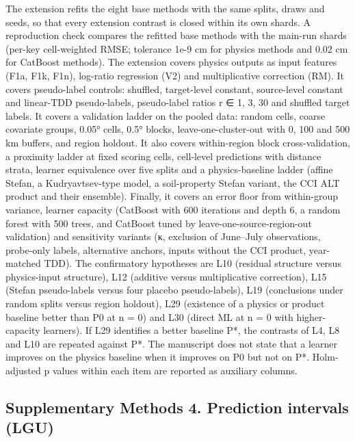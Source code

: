 The extension refits the eight base methods with the same splits, draws and seeds, so that every extension contrast is closed within its own shards. A reproduction check compares the refitted base methods with the main-run shards (per-key cell-weighted RMSE; tolerance 1e-9 cm for physics methods and 0.02 cm for CatBoost methods). The extension covers physics outputs as input features (F1a, F1k, F1n), log-ratio regression (V2) and multiplicative correction (RM). It covers pseudo-label controls: shuffled, target-level constant, source-level constant and linear-TDD pseudo-labels, pseudo-label ratios r ∈ {1, 3, 30} and shuffled target labels. It covers a validation ladder on the pooled data: random cells, coarse covariate groups, 0.05° cells, 0.5° blocks, leave-one-cluster-out with 0, 100 and 500 km buffers, and region holdout. It also covers within-region block cross-validation, a proximity ladder at fixed scoring cells, cell-level predictions with distance strata, learner equivalence over five splits and a physics-baseline ladder (affine Stefan, a Kudryavtsev-type model\cite{Kudryavtsev1974}, a soil-property Stefan variant, the CCI ALT product and their ensemble). Finally, it covers an error floor from within-group variance, learner capacity (CatBoost with 600 iterations and depth 6, a random forest with 500 trees, and CatBoost tuned by leave-one-source-region-out validation) and sensitivity variants (κ, exclusion of June–July observations, probe-only labels, alternative anchors, inputs without the CCI product, year-matched TDD). The confirmatory hypotheses are L10 (residual structure versus physics-input structure), L12 (additive versus multiplicative correction), L15 (Stefan pseudo-labels versus four placebo pseudo-labels), L19 (conclusions under random splits versus region holdout), L29 (existence of a physics or product baseline better than P0 at n = 0) and L30 (direct ML at n = 0 with higher-capacity learners). If L29 identifies a better baseline P*, the contrasts of L4, L8 and L10 are repeated against P*. The manuscript does not state that a learner improves on the physics baseline when it improves on P0 but not on P*. Holm-adjusted p values within each item are reported as auxiliary columns.

\subsection*{Supplementary Methods 4. Prediction intervals (LGU)}

